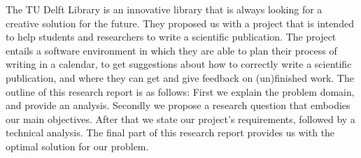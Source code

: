The TU Delft Library is an innovative library that is always looking for a creative solution for the future. They proposed us with a project that is intended to help students and researchers to write a scientific publication. The project entails a software environment in which they are able to plan their process of writing in a calendar, to get suggestions about how to correctly write a scientific publication, and where they can get and give feedback on (un)finished work.
The outline of this research report is as follows: First we explain the problem domain, and provide an analysis. Secondly we propose a research question that embodies our main objectives. After that we state our project's requirements, followed by a technical analysis. The final part of this research report provides us with the optimal solution for our problem.